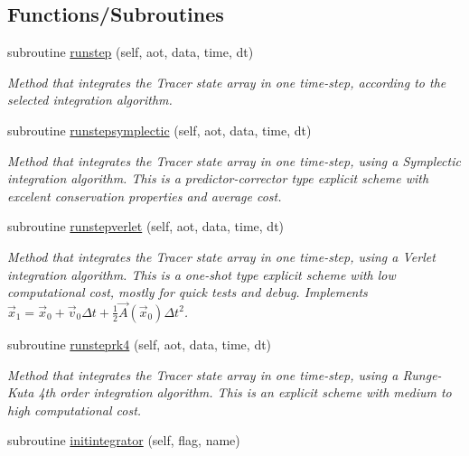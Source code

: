 \subsection*{Functions/\+Subroutines}
\begin{DoxyCompactItemize}
\item 
subroutine \mbox{\hyperlink{namespaceintegrator__mod_a057e4afe510b4382b006005105ca1718}{runstep}} (self, aot, data, time, dt)
\begin{DoxyCompactList}\small\item\em Method that integrates the Tracer state array in one time-\/step, according to the selected integration algorithm. \end{DoxyCompactList}\item 
subroutine \mbox{\hyperlink{namespaceintegrator__mod_aa867e98470b3ec97a666099e8258b6ef}{runstepsymplectic}} (self, aot, data, time, dt)
\begin{DoxyCompactList}\small\item\em Method that integrates the Tracer state array in one time-\/step, using a Symplectic integration algorithm. This is a predictor-\/corrector type explicit scheme with excelent conservation properties and average cost. \end{DoxyCompactList}\item 
subroutine \mbox{\hyperlink{namespaceintegrator__mod_af53e2642a8984c3841ae6085704f7b8d}{runstepverlet}} (self, aot, data, time, dt)
\begin{DoxyCompactList}\small\item\em Method that integrates the Tracer state array in one time-\/step, using a Verlet integration algorithm. This is a one-\/shot type explicit scheme with low computational cost, mostly for quick tests and debug. Implements $ {\vec {x}}_{1}={\vec {x}}_{0}+{\vec {v}}_{0}\Delta t+{\frac {1}{2}}{\vec {A}}({\vec {x}}_{0})\Delta t^{2}$. \end{DoxyCompactList}\item 
subroutine \mbox{\hyperlink{namespaceintegrator__mod_a5041a009a45095be904f30377c509e7e}{runsteprk4}} (self, aot, data, time, dt)
\begin{DoxyCompactList}\small\item\em Method that integrates the Tracer state array in one time-\/step, using a Runge-\/\+Kuta 4th order integration algorithm. This is an explicit scheme with medium to high computational cost. \end{DoxyCompactList}\item 
subroutine \mbox{\hyperlink{namespaceintegrator__mod_acb397b27678b3fb5f9d6b0021b5ab058}{initintegrator}} (self, flag, name)

\end{DoxyCompactItemize}
